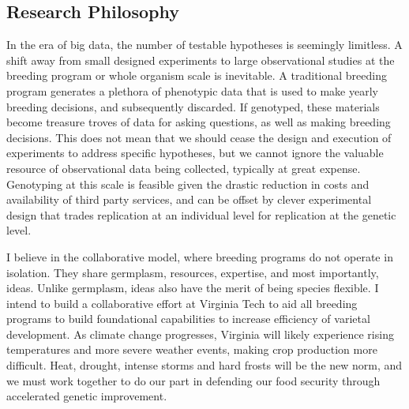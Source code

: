 \documentclass[11pt]{article}
\begin{document}
\subsection*{Research Philosophy}

In the era of big data, the number of testable hypotheses is seemingly limitless. A shift away from small designed experiments to large observational studies at the breeding program or whole organism scale is inevitable. A traditional breeding program generates a plethora of phenotypic data that is used to make yearly breeding decisions, and subsequently discarded. If genotyped, these materials become treasure troves of data for asking questions, as well as making breeding decisions. This does not mean that we should cease the design and execution of experiments to address specific hypotheses, but we cannot ignore the valuable resource of observational data being collected, typically at great expense. Genotyping at this scale is feasible given the drastic reduction in costs and availability of third party services, and can be offset by clever experimental design that trades replication at an individual level for replication at the genetic level.

I believe in the collaborative model, where breeding programs do not operate in isolation. They share germplasm, resources, expertise, and most importantly, ideas. Unlike germplasm, ideas also have the merit of being species flexible. I intend to build a collaborative effort at Virginia Tech to aid all breeding programs to build foundational capabilities to increase efficiency of varietal development. As climate change progresses, Virginia will likely experience rising temperatures and more severe weather events, making crop production more difficult. Heat, drought, intense storms and hard frosts will be the new norm, and we must work together to do our part in defending our food security through accelerated genetic improvement. 



\end{document}
